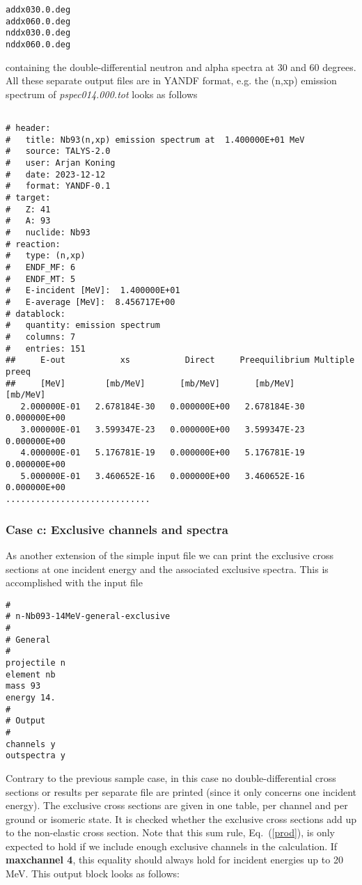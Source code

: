 \begin{samplecase}
{\begin{verbatim}
addx030.0.deg
addx060.0.deg
nddx030.0.deg
nddx060.0.deg
\end{verbatim} } \renewcommand{\baselinestretch}{1.07}\small\normalsize
\noindent
containing the double-differential neutron and alpha spectra at 30 and 60 
degrees.
All these separate output files are in YANDF format, e.g. the (n,xp) emission
spectrum of {\it pspec014.000.tot} looks as follows
{\small \begin{verbatim}

# header:
#   title: Nb93(n,xp) emission spectrum at  1.400000E+01 MeV
#   source: TALYS-2.0
#   user: Arjan Koning
#   date: 2023-12-12
#   format: YANDF-0.1
# target:
#   Z: 41
#   A: 93
#   nuclide: Nb93
# reaction:
#   type: (n,xp)
#   ENDF_MF: 6
#   ENDF_MT: 5
#   E-incident [MeV]:  1.400000E+01
#   E-average [MeV]:  8.456717E+00
# datablock:
#   quantity: emission spectrum
#   columns: 7
#   entries: 151
##     E-out           xs           Direct     Preequilibrium Multiple preeq
##     [MeV]        [mb/MeV]       [mb/MeV]       [mb/MeV]       [mb/MeV]   
   2.000000E-01   2.678184E-30   0.000000E+00   2.678184E-30   0.000000E+00 
   3.000000E-01   3.599347E-23   0.000000E+00   3.599347E-23   0.000000E+00 
   4.000000E-01   5.176781E-19   0.000000E+00   5.176781E-19   0.000000E+00 
   5.000000E-01   3.460652E-16   0.000000E+00   3.460652E-16   0.000000E+00 
.............................
\end{verbatim} } \renewcommand{\baselinestretch}{1.07}\small\normalsize
\noindent

\subsubsection{Case c: Exclusive channels and spectra}
As another extension of the simple input file we can print the exclusive cross
sections at one incident energy and the associated exclusive spectra.
This is accomplished with the input file

{\small \begin{verbatim}
#
# n-Nb093-14MeV-general-exclusive
#
# General
#
projectile n
element nb
mass 93
energy 14.
#
# Output
#
channels y 
outspectra y
\end{verbatim} } \renewcommand{\baselinestretch}{1.07}\small\normalsize
\noindent
Contrary to the previous sample case, in this case no double-differential 
cross sections or 
results per separate file are printed (since it only concerns one incident 
energy). The exclusive cross sections are given 
in one table, per channel and per ground or isomeric state. It is checked 
whether the exclusive cross sections add up to the non-elastic cross section. 
Note that this sum rule, Eq.~(\ref{prod}), is only expected to hold if we 
include 
enough exclusive channels in the calculation. If {\bf maxchannel 4}, this 
equality should always hold for incident energies up to 20 MeV. This output 
block looks as follows:


\end{samplecase}
